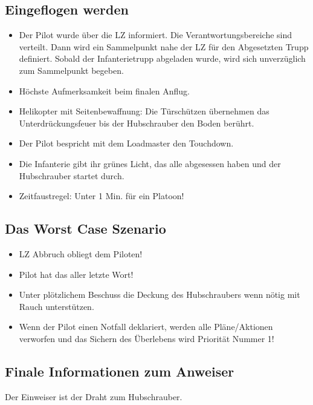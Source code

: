 \subsection{Eingeflogen werden}
	\begin{itemize} 
		\item Der Pilot wurde über die \ac{LZ} informiert. Die Verantwortungsbereiche sind verteilt. Dann wird ein Sammelpunkt nahe der \ac{LZ} für den Abgesetzten Trupp definiert. Sobald der Infanterietrupp abgeladen wurde, wird sich unverzüglich zum Sammelpunkt begeben.

		\item Höchste Aufmerksamkeit beim finalen Anflug.

		\item Helikopter mit Seitenbewaffnung: Die Türschützen übernehmen das Unter\-drückungs\-feuer bis der Hubschrauber den Boden berührt.

		\item Der Pilot bespricht mit dem Loadmaster den Touchdown.

		\item Die Infanterie gibt ihr grünes Licht, das alle abgesessen haben und der Hubschrauber startet durch.

		\item Zeitfaustregel: Unter 1 Min. für ein Platoon!
	\end{itemize}

\subsection{Das Worst Case Szenario}
	\begin{itemize}
		\item \ac{LZ} Abbruch obliegt dem Piloten!
		\item Pilot hat das aller letzte Wort!
		\item Unter plötzlichem Beschuss die Deckung des Hubschraubers wenn nötig mit Rauch unterstützen.
		\item Wenn der Pilot einen Notfall deklariert, werden alle Pläne/Aktionen verworfen und das Sichern des Überlebens wird Priorität Nummer 1!
	\end{itemize}

\subsection{Finale Informationen zum Anweiser}
	Der Einweiser ist der Draht zum Hubschrauber.

